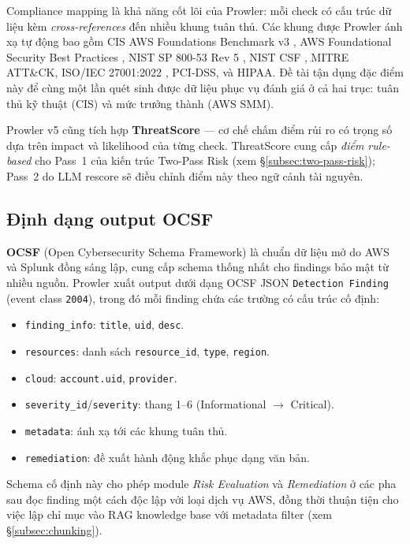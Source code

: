 Compliance mapping là khả năng cốt lõi của Prowler: mỗi check có cấu trúc dữ liệu kèm \textit{cross-references} đến nhiều khung tuân thủ. Các khung được Prowler ánh xạ tự động bao gồm CIS AWS Foundations Benchmark v3 \cite{cis_aws_foundations}, AWS Foundational Security Best Practices \cite{aws_fsbp}, NIST SP 800-53 Rev 5 \cite{nist_800_53_r5}, NIST CSF \cite{nist_csf_2024}, MITRE ATT\&CK, ISO/IEC 27001:2022 \cite{iso_27001_2022}, PCI-DSS, và HIPAA. Đề tài tận dụng đặc điểm này để cùng một lần quét sinh được dữ liệu phục vụ đánh giá ở cả hai trục: tuân thủ kỹ thuật (CIS) và mức trưởng thành (AWS SMM).

Prowler v5 cũng tích hợp \textbf{ThreatScore} --- cơ chế chấm điểm rủi ro có trọng số dựa trên impact và likelihood của từng check. ThreatScore cung cấp \textit{điểm rule-based} cho Pass~1 của kiến trúc Two-Pass Risk (xem §\ref{subsec:two-pass-risk}); Pass~2 do LLM rescore sẽ điều chỉnh điểm này theo ngữ cảnh tài nguyên.

\subsection{Định dạng output OCSF}
\label{subsec:prowler-ocsf}

\textbf{OCSF} (Open Cybersecurity Schema Framework) là chuẩn dữ liệu mở do AWS và Splunk đồng sáng lập, cung cấp schema thống nhất cho findings bảo mật từ nhiều nguồn. Prowler xuất output dưới dạng OCSF JSON \texttt{Detection Finding} (event class \texttt{2004}), trong đó mỗi finding chứa các trường có cấu trúc cố định:
\begin{itemize}
  \item \texttt{finding\_info}: \texttt{title}, \texttt{uid}, \texttt{desc}.
  \item \texttt{resources}: danh sách \texttt{resource\_id}, \texttt{type}, \texttt{region}.
  \item \texttt{cloud}: \texttt{account.uid}, \texttt{provider}.
  \item \texttt{severity\_id}/\texttt{severity}: thang 1--6 (Informational $\rightarrow$ Critical).
  \item \texttt{metadata}: ánh xạ tới các khung tuân thủ.
  \item \texttt{remediation}: đề xuất hành động khắc phục dạng văn bản.
\end{itemize}

Schema cố định này cho phép module \textit{Risk Evaluation} và \textit{Remediation} ở các pha sau đọc finding một cách độc lập với loại dịch vụ AWS, đồng thời thuận tiện cho việc lập chỉ mục vào RAG knowledge base với metadata filter (xem §\ref{subsec:chunking}).

